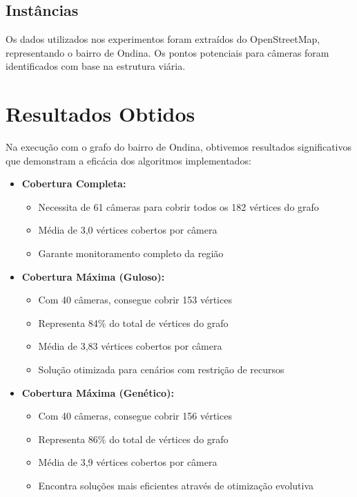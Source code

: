 \documentclass[12pt, a4paper]{report}
\begin{document}
\subsection{Instâncias}
Os dados utilizados nos experimentos foram extraídos do OpenStreetMap, representando o bairro de Ondina. Os pontos potenciais para câmeras foram identificados com base na estrutura viária.

\section{Resultados Obtidos}
Na execução com o grafo do bairro de Ondina, obtivemos resultados significativos que demonstram a eficácia dos algoritmos implementados:

\begin{itemize}
    \item \textbf{Cobertura Completa:}
    \begin{itemize}
        \item Necessita de 61 câmeras para cobrir todos os 182 vértices do grafo
        \item Média de 3,0 vértices cobertos por câmera
        \item Garante monitoramento completo da região
    \end{itemize}
    
    \item \textbf{Cobertura Máxima (Guloso):}
    \begin{itemize}
        \item Com 40 câmeras, consegue cobrir 153 vértices
        \item Representa 84\% do total de vértices do grafo
        \item Média de 3,83 vértices cobertos por câmera
        \item Solução otimizada para cenários com restrição de recursos
    \end{itemize}
    
    \item \textbf{Cobertura Máxima (Genético):}
    \begin{itemize}
        \item Com 40 câmeras, consegue cobrir 156 vértices
        \item Representa 86\% do total de vértices do grafo
        \item Média de 3,9 vértices cobertos por câmera
        \item Encontra soluções mais eficientes através de otimização evolutiva
    \end{itemize}
\end{itemize}
\end{document}
